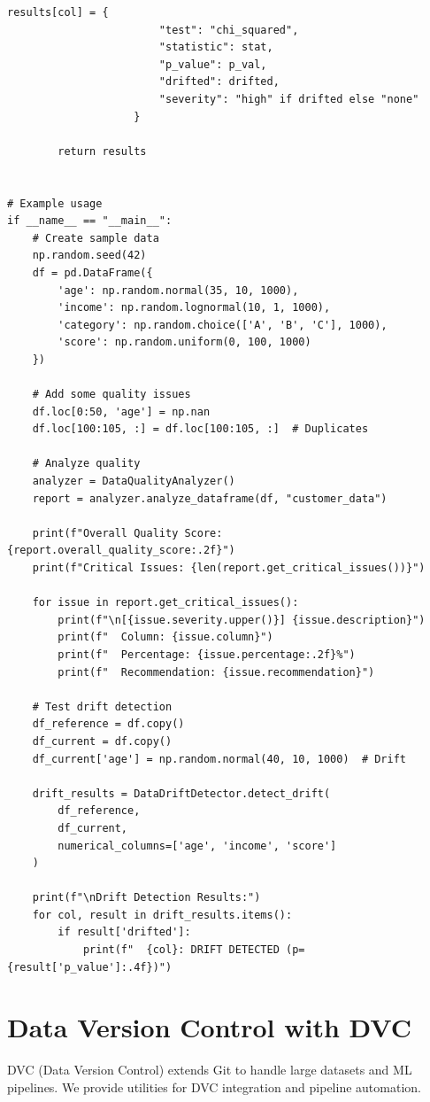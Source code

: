 \begin{lstlisting}[style=python, caption={Data quality metrics with statistical validation}]
                    results[col] = {
                        "test": "chi_squared",
                        "statistic": stat,
                        "p_value": p_val,
                        "drifted": drifted,
                        "severity": "high" if drifted else "none"
                    }

        return results


# Example usage
if __name__ == "__main__":
    # Create sample data
    np.random.seed(42)
    df = pd.DataFrame({
        'age': np.random.normal(35, 10, 1000),
        'income': np.random.lognormal(10, 1, 1000),
        'category': np.random.choice(['A', 'B', 'C'], 1000),
        'score': np.random.uniform(0, 100, 1000)
    })

    # Add some quality issues
    df.loc[0:50, 'age'] = np.nan
    df.loc[100:105, :] = df.loc[100:105, :]  # Duplicates

    # Analyze quality
    analyzer = DataQualityAnalyzer()
    report = analyzer.analyze_dataframe(df, "customer_data")

    print(f"Overall Quality Score: {report.overall_quality_score:.2f}")
    print(f"Critical Issues: {len(report.get_critical_issues())}")

    for issue in report.get_critical_issues():
        print(f"\n[{issue.severity.upper()}] {issue.description}")
        print(f"  Column: {issue.column}")
        print(f"  Percentage: {issue.percentage:.2f}%")
        print(f"  Recommendation: {issue.recommendation}")

    # Test drift detection
    df_reference = df.copy()
    df_current = df.copy()
    df_current['age'] = np.random.normal(40, 10, 1000)  # Drift

    drift_results = DataDriftDetector.detect_drift(
        df_reference,
        df_current,
        numerical_columns=['age', 'income', 'score']
    )

    print(f"\nDrift Detection Results:")
    for col, result in drift_results.items():
        if result['drifted']:
            print(f"  {col}: DRIFT DETECTED (p={result['p_value']:.4f})")
\end{lstlisting}

\section{Data Version Control with DVC}

DVC (Data Version Control) extends Git to handle large datasets and ML pipelines. We provide utilities for DVC integration and pipeline automation.

